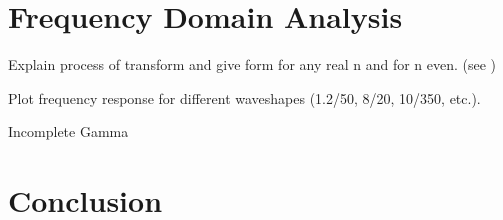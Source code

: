 \section{Frequency Domain Analysis}
\label{sec:frequency_domain_analysis}

Explain process of transform and give form for any real n and for n even. (see )

Plot frequency response for different waveshapes (1.2/50, 8/20, 10/350, etc.).

Incomplete Gamma \cite{Gautschi:1979:CPI}


\section{Conclusion}
\label{sec:conclusion}
